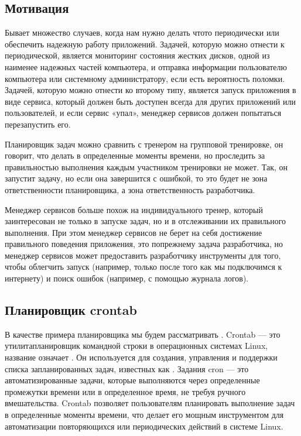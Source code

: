 \documentclass[letterpaper,10pt,russian]{sphinxmanual}
\begin{document}
\subsection{Мотивация}
\label{\detokenize{educational_materials/managers/content:id2}}
\sphinxAtStartPar
Бывает множество случаев, когда нам нужно делать что\sphinxhyphen{}то периодически или обеспечить надежную работу приложений. Задачей, которую можно отнести к периодической, является мониторинг состояния жестких дисков, одной из наименее надежных частей компьютера, и отправка информации пользователю компьютера или системному администратору, если есть вероятность поломки. Задачей, которую можно отнести ко второму типу, является запуск приложения в виде сервиса, который должен быть доступен всегда для других приложений или пользователей, и если сервис «упал», менеджер сервисов должен попытаться перезапустить его.

\sphinxAtStartPar
Планировщик задач можно сравнить с тренером на групповой тренировке, он говорит, что делать в определенные моменты времени, но проследить за правильностью выполнения каждым участником тренировки не может. Так, он запустит задачу, но если она завершится с ошибкой, то это будет не зона ответственности планировщика, а зона ответственность разработчика.

\sphinxAtStartPar
Менеджер сервисов больше похож на индивидуального тренер, который заинтересован не только в запуске задач, но и в отслеживании их правильного выполнения. При этом менеджер сервисов не берет на себя  достижение правильного поведения приложения, это по\sphinxhyphen{}прежнему задача разработчика, но менеджер сервисов может предоставить разработчику инструменты для того, чтобы облегчить запуск (например, только после того как мы подключимся к интернету) и поиск ошибок (например, с помощью журнала логов).


\subsection{Планировщик crontab}
\label{\detokenize{educational_materials/managers/content:crontab}}
\sphinxAtStartPar
В качестве примера планировщика мы будем рассматривать . Crontab — это утилита\sphinxhyphen{}планировщик командной строки в операционных системах Linux, название означает . Он используется для создания, управления и поддержки списка запланированных задач, известных как . Задания cron — это автоматизированные задачи, которые выполняются через определенные промежутки времени или в определенное время, не требуя ручного вмешательства. Crontab позволяет пользователям планировать выполнение задач в определенные моменты времени, что делает его мощным инструментом для автоматизации повторяющихся или периодических действий в системе Linux.
\end{document}

